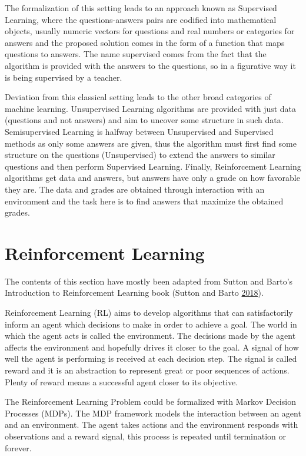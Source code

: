 \documentclass[
]{book}
\begin{document}
The formalization of this setting leads to an approach known as Supervised Learning, where the questions-answers pairs are codified into mathematical objects, usually numeric vectors for questions and real numbers or categories for answers and the proposed solution comes in the form of a function that maps questions to answers. The name supervised comes from the fact that the algorithm is provided with the answers to the questions, so in a figurative way it is being supervised by a teacher.

Deviation from this classical setting leads to the other broad categories of machine learning. Unsupervised Learning algorithms are provided with just data (questions and not answers) and aim to uncover some structure in such data. Semisupervised Learning is halfway between Unsupervised and Supervised methods as only some answers are given, thus the algorithm must first find some structure on the questions (Unsupervised) to extend the answers to similar questions and then perform Supervised Learning. Finally, Reinforcement Learning algorithms get data and answers, but answers have only a grade on how favorable they are. The data and grades are obtained through interaction with an environment and the task here is to find answers that maximize the obtained grades.

\hypertarget{reinforcement-learning-1}{%
\section{Reinforcement Learning}\label{reinforcement-learning-1}}

The contents of this section have mostly been adapted from Sutton and Barto's Introduction to Reinforcement Learning book (Sutton and Barto \protect\hyperlink{ref-sutton2018reinforcement}{2018}).

Reinforcement Learning (RL) aims to develop algorithms that can satisfactorily inform an agent which decisions to make in order to achieve a goal. The world in which the agent acts is called the environment. The decisions made by the agent affects the environment and hopefully drives it closer to the goal. A signal of how well the agent is performing is received at each decision step. The signal is called reward and it is an abstraction to represent great or poor sequences of actions. Plenty of reward means a successful agent closer to its objective.

The Reinforcement Learning Problem could be formalized with Markov Decision Processes (MDPs). The MDP framework models the interaction between an agent and an environment. The agent takes actions and the environment responds with observations and a reward signal, this process is repeated until termination or forever.
\end{document}
